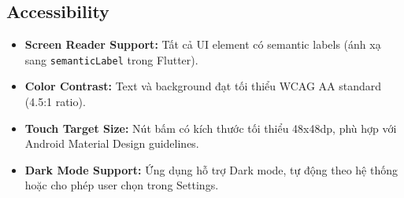 \subsection{Accessibility}

\begin{itemize}
    \item \textbf{Screen Reader Support:} Tất cả UI element có semantic labels (ánh xạ sang \texttt{semanticLabel} trong Flutter).
    
    \item \textbf{Color Contrast:} Text và background đạt tối thiểu WCAG AA standard (4.5:1 ratio).
    
    \item \textbf{Touch Target Size:} Nút bấm có kích thước tối thiểu 48x48dp, phù hợp với Android Material Design guidelines.
    
    \item \textbf{Dark Mode Support:} Ứng dụng hỗ trợ Dark mode, tự động theo hệ thống hoặc cho phép user chọn trong Settings.
\end{itemize}
